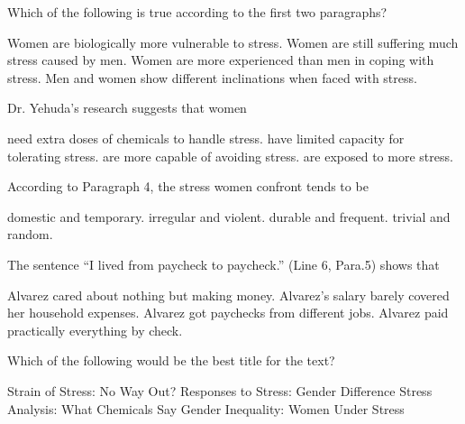 \item Which of the following is true according to the first two paragraphs?
\begin{tasks}
	\task Women are biologically more vulnerable to stress.
	\task Women are still suffering much stress caused by men.
	\task Women are more experienced than men in coping with stress.
	\task Men and women show different inclinations when faced with stress.
\end{tasks}
\item Dr. Yehuda's research suggests that women
\begin{tasks}
	\task need extra doses of chemicals to handle stress.
	\task have limited capacity for tolerating stress.
	\task are more capable of avoiding stress.
	\task are exposed to more stress.
\end{tasks}
\item According to Paragraph 4, the stress women confront tends to be
\begin{tasks}
	\task domestic and temporary.
	\task irregular and violent.
	\task durable and frequent.
	\task trivial and random.
\end{tasks}
\item The sentence ``I lived from paycheck to paycheck.'' (Line 6, Para.5) shows that
\begin{tasks}
	\task Alvarez cared about nothing but making money.
	\task Alvarez's salary barely covered her household expenses.
	\task Alvarez got paychecks from different jobs.
	\task Alvarez paid practically everything by check.
\end{tasks}
\item Which of the following would be the best title for the text?
\begin{tasks}
	\task Strain of Stress: No Way Out?
	\task Responses to Stress: Gender Difference
	\task Stress Analysis: What Chemicals Say
	\task Gender Inequality: Women Under Stress
\end{tasks}